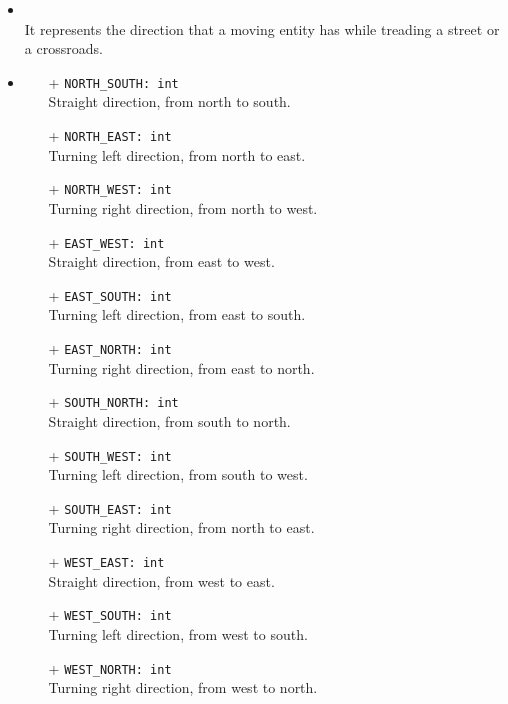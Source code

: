 \begin{itemize}
  \item \textbf{\descr} \\
    It represents the direction that a moving entity has while treading a
    street or a crossroads.
  \item \textbf{}
  \begin{itemize}
    \item[+] \texttt{NORTH\_SOUTH: int} \\
    Straight direction, from north to south.
    \item[+] \texttt{NORTH\_EAST: int} \\
    Turning left direction, from north to east.
    \item[+] \texttt{NORTH\_WEST: int} \\
    Turning right direction, from north to west.
    \item[+] \texttt{EAST\_WEST: int} \\
    Straight direction, from east to west.
    \item[+] \texttt{EAST\_SOUTH: int} \\
    Turning left direction, from east to south.
    \item[+] \texttt{EAST\_NORTH: int} \\
    Turning right direction, from east to north.
    \item[+] \texttt{SOUTH\_NORTH: int} \\
    Straight direction, from south to north.
    \item[+] \texttt{SOUTH\_WEST: int} \\
    Turning left direction, from south to west.
    \item[+] \texttt{SOUTH\_EAST: int} \\
    Turning right direction, from north to east.
    \item[+] \texttt{WEST\_EAST: int} \\
    Straight direction, from west to east.
    \item[+] \texttt{WEST\_SOUTH: int} \\
    Turning left direction, from west to south.
    \item[+] \texttt{WEST\_NORTH: int} \\
    Turning right direction, from west to north.
  \end{itemize}
\end{itemize}